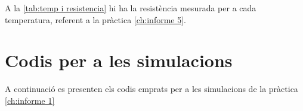 A la \cref{tab:temp i resistencia} hi ha la resistència mesurada per a cada temperatura, referent a la pràctica \ref{ch:informe 5}.

\newpage
\section{Codis per a les simulacions}\label{sec:codis}
A continuació es presenten els codis emprats per a les simulacions de la pràctica \ref{ch:informe 1}





